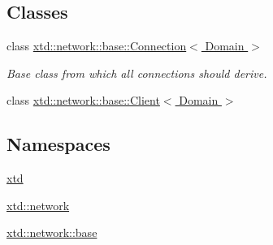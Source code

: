 \subsection*{Classes}
\begin{DoxyCompactItemize}
\item 
class \hyperlink{classxtd_1_1network_1_1base_1_1Connection}{xtd\-::network\-::base\-::\-Connection$<$ Domain $>$}
\begin{DoxyCompactList}\small\item\em Base class from which all connections should derive. \end{DoxyCompactList}\item 
class \hyperlink{classxtd_1_1network_1_1base_1_1Client}{xtd\-::network\-::base\-::\-Client$<$ Domain $>$}
\end{DoxyCompactItemize}
\subsection*{Namespaces}
\begin{DoxyCompactItemize}
\item 
\hyperlink{namespacextd}{xtd}
\item 
\hyperlink{namespacextd_1_1network}{xtd\-::network}
\item 
\hyperlink{namespacextd_1_1network_1_1base}{xtd\-::network\-::base}
\end{DoxyCompactItemize}
